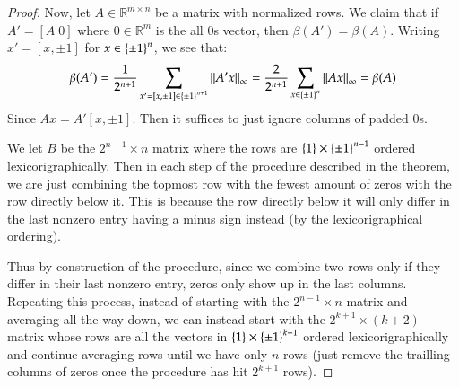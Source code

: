 \documentclass[12pt]{article}
\theoremstyle{definitionstyle}
\def\mbb#1{\mathbb{#1}}
\def\R{\mbb{R}}
\newcommand{\SET}[1]{\Set{\mskip-\medmuskip #1 \mskip-\medmuskip}}
\begin{document}
\begin{proof}


Now, let $A \in \R^{m \times n}$ be a matrix with normalized rows. We claim that if $A' = [A \; 0]$ where $0 \in \R^m$ is the all 0s vector, then $\beta(A') = \beta(A)$. Writing $x' = [x, \pm 1]$ for $x \in \SET{\pm 1}^n$, we see that:
\begin{align*}
    \beta(A') = \frac{1}{2^{n+1}} \sum_{x' = [x, \pm 1] \in \SET{\pm 1}^{n+1}} \norm{A'x}_\infty = \frac{2}{2^{n+1}} \sum_{x \in \SET{\pm 1}^{n}} \norm{Ax}_\infty = \beta(A)
\end{align*}
Since $Ax = A'[x, \pm 1]$. Then it suffices to just ignore columns of padded 0s. 

We let $B$ be the $2^{n-1} \times n$ matrix where the rows are $\SET{1} \times \SET{\pm 1}^{n-1}$ ordered lexicorigraphically. Then in each step of the procedure described in the theorem, we are just combining the topmost row with the fewest amount of zeros with the row directly below it. This is because the row directly below it will only differ in the last nonzero entry having a minus sign instead (by the lexicorigraphical ordering). 

Thus by construction of the procedure, since we combine two rows only if they differ in their last nonzero entry, zeros only show up in the last columns. Repeating this process, instead of starting with the $2^{n-1} \times n$ matrix and averaging all the way down, we can instead start with the $2^{k+1} \times (k+2)$ matrix whose rows are all the vectors in $\SET{1} \times \SET{\pm 1}^{k+1}$ ordered lexicorigraphically and continue averaging rows until we have only $n$ rows (just remove the trailling columns of zeros once the procedure has hit $2^{k+1}$ rows).


\end{proof}
\end{document}
